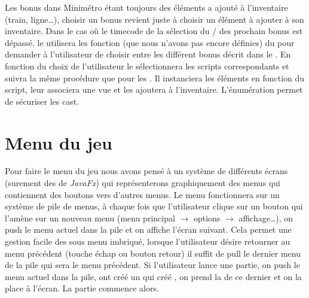 \documentclass[report, backcover, french, nodocumentinfo]{upmethodology-document}
\begin{document}
				Les bonus dans Minimétro étant toujours des éléments a ajouté à l'inventaire (train, ligne\ldots), choisir un bonus revient juste à choisir un élément à ajouter à son inventaire. Dans le cas où le timecode de la sélection du / des prochain bonus est dépassé, le  utilisera les fonction (que nous n'avons pas encore définies) du  pour demander à l'utilisateur de choisir entre les différent bonus décrit dans le . En fonction du choix de l'utilisateur le  sélectionnera les scripts correspondants et suivra la même procédure que pour les . Il instanciera les éléments en fonction du script, leur associera une vue et les ajoutera à l'inventaire. L'énumération  permet de sécuriser les cast.
		\section{Menu du jeu}
			Pour faire le menu du jeu nous avons pensé à un système de différents écrans (surement des  de \textit{JavaFx}) qui représenterons graphiquement des menus qui contiennent des boutons vers d'autres menus. Le menu fonctionnera sur un système de pile de menus, à chaque fois que l'utilisateur clique sur un bouton qui l'amène sur un nouveau menu (menu principal $\rightarrow$ options $\rightarrow$ affichage\ldots), on push le menu actuel dans la pile et on affiche l'écran suivant. Cela permet une gestion facile des sous menu imbriqué, lorsque l'utilisateur désire retourner au menu précédent (touche échap ou bouton retour) il suffit de pull le dernier menu de la pile qui sera le menu précédent. Si l'utilisateur lance une partie, on push le menu actuel dans la pile, ont créé un  qui créé , on prend la  de ce dernier et on la place à l'écran. La partie commence alors.
\end{document}
